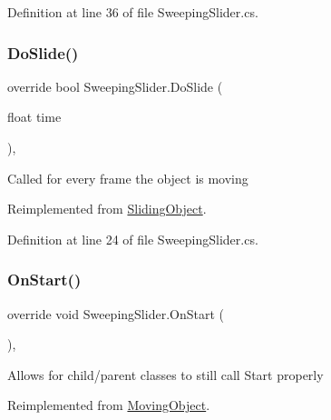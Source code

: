 Definition at line 36 of file Sweeping\+Slider.\+cs.

\mbox{\label{class_sweeping_slider_ac2a74d4cc8483404f577f51aef02589e}} 
\subsubsection{\texorpdfstring{Do\+Slide()}{DoSlide()}}
{\footnotesize\ttfamily override bool Sweeping\+Slider.\+Do\+Slide (\begin{DoxyParamCaption}\item[{float}]{time }\end{DoxyParamCaption})\hspace{0.3cm}{\ttfamily [protected]}, {\ttfamily [virtual]}}



Called for every frame the object is moving 



Reimplemented from \mbox{\hyperlink{class_sliding_object_a5da98cd763d752b6a7378d181b35f3d0}{Sliding\+Object}}.



Definition at line 24 of file Sweeping\+Slider.\+cs.

\mbox{\label{class_sweeping_slider_a333d1088bd5ef48fe770e43527f75c49}} 
\subsubsection{\texorpdfstring{On\+Start()}{OnStart()}}
{\footnotesize\ttfamily override void Sweeping\+Slider.\+On\+Start (\begin{DoxyParamCaption}{ }\end{DoxyParamCaption})\hspace{0.3cm}{\ttfamily [protected]}, {\ttfamily [virtual]}}



Allows for child/parent classes to still call Start properly 



Reimplemented from \mbox{\hyperlink{class_moving_object_a17c2c8f8e720dc68bf25c0abc59bf5f9}{Moving\+Object}}.



